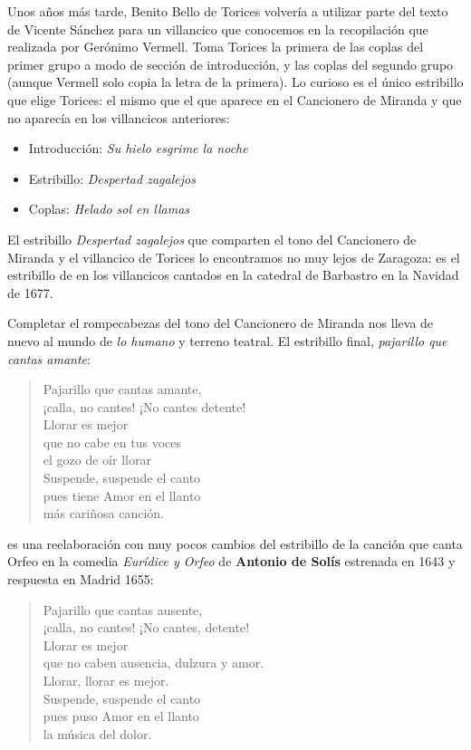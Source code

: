 Unos años más tarde, Benito Bello de Torices volvería a utilizar parte del texto de Vicente Sánchez para un villancico que conocemos en la recopilación que realizada por Gerónimo Vermell. Toma Torices la primera de las coplas del primer grupo a modo de sección de introducción, y las coplas del segundo grupo (aunque Vermell solo copia la letra de la primera). Lo curioso es el único estribillo que elige Torices: el mismo que el que aparece en el Cancionero de Miranda y que no aparecía en los villancicos anteriores:

\begin{itemize}
	\item Introducción: \textit{Su hielo esgrime la noche} 
	\item Estribillo: \textit{Despertad zagalejos}
	\item Coplas: \textit{Helado sol en llamas} 
\end{itemize}


El estribillo \textit{Despertad zagalejos} que comparten el tono del Cancionero de Miranda y el villancico de Torices lo encontramos no muy lejos de Zaragoza: es el estribillo de en los villancicos cantados en la catedral de Barbastro en la Navidad de 1677.

Completar el rompecabezas del tono del Cancionero de Miranda nos lleva de nuevo al mundo de \textit{lo humano} y terreno teatral. El estribillo final, \textit{pajarillo que cantas amante}:

\begingroup
\centering
\itshape
\setlength{\vrightskip}{-3em}
\begin{verse}
Pajarillo que cantas amante,\\
¡calla, no cantes! ¡No cantes detente!\\
Llorar es mejor\\
que no cabe en tus voces\\
el gozo de oír llorar\\
Suspende, suspende el canto\\
pues tiene Amor en el llanto\\
más cariñosa canción.\\
\end{verse}
\endgroup


es una reelaboración con muy pocos cambios del estribillo de la canción que canta Orfeo en la comedia \textit{Eurídice y Orfeo} de \textbf{Antonio de Solís} estrenada en 1643 y respuesta en Madrid 1655:

\begingroup
\centering
\itshape
\setlength{\vrightskip}{-3em}
\begin{verse}
Pajarillo que cantas ausente,\\
¡calla, no cantes! ¡No cantes, detente!\\
Llorar es mejor\\
que no caben ausencia, dulzura y amor.\\
Llorar, llorar es mejor.\\
Suspende, suspende el canto\\
pues puso Amor en el llanto\\
la música del dolor.\\
\end{verse}
\endgroup


